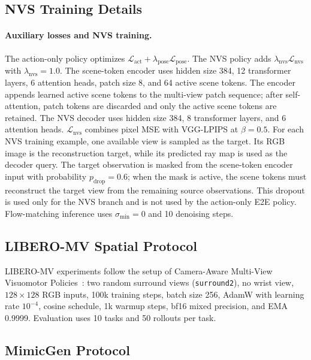 \subsection{NVS Training Details}
\label{sec:appendix-nvs-training}

\paragraph{Auxiliary losses and NVS training.}
The action-only policy optimizes \(\mathcal{L}_{\text{act}}+
\lambda_{\text{pose}}\mathcal{L}_{\text{pose}}\).  The NVS policy adds
\(\lambda_{\text{nvs}}\mathcal{L}_{\text{nvs}}\) with
\(\lambda_{\text{nvs}}=1.0\).  The scene-token encoder uses hidden size 384, 12
transformer layers, 6 attention heads, patch size 8, and 64 active scene tokens.
The encoder appends learned active scene tokens to the multi-view patch sequence;
after self-attention, patch tokens are discarded and only the active scene tokens
are retained.  The NVS decoder uses hidden size 384, 8 transformer layers, and 6
attention heads.  \(\mathcal{L}_{\text{nvs}}\) combines pixel MSE with VGG-LPIPS at
\(\beta=0.5\).  For each NVS training example, one available view is sampled as
the target.  Its RGB image is the reconstruction target, while its predicted ray
map is used as the decoder query.  The target observation is masked from the
scene-token encoder input with probability \(p_{\text{drop}}=0.6\); when the mask
is active, the scene tokens must reconstruct the target view from the remaining
source observations.
This dropout is used only for the NVS branch and is not used by the
action-only E2E policy.  Flow-matching inference uses \(\sigma_{\min}=0\) and
10 denoising steps.

\subsection{LIBERO-MV Spatial Protocol}
\label{sec:appendix-libero-protocol}

LIBERO-MV experiments follow the setup of Camera-Aware Multi-View Visuomotor
Policies~\citep{anonymous2026cameraaware}: two random surround views
(\texttt{surround2}), no wrist view, \(128{\times}128\) RGB inputs, 100k
training steps, batch size 256, AdamW with learning rate \(10^{-4}\), cosine
schedule, 1k warmup steps, bf16 mixed precision, and EMA 0.9999.  Evaluation
uses 10 tasks and 50 rollouts per task.

\subsection{MimicGen Protocol}
\label{sec:appendix-mimicgen-protocol}

